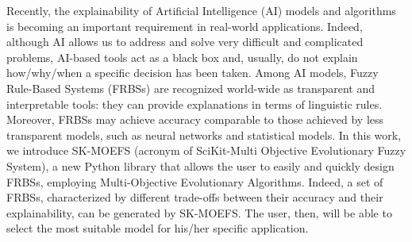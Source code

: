 
Recently, the explainability of Artificial Intelligence (AI) models and algorithms is becoming an important requirement in real-world applications. Indeed, although AI allows us to address and solve very difficult and complicated problems, AI-based tools act as a black box and, usually, do not explain how/why/when a specific decision has been taken. Among AI models, Fuzzy Rule-Based Systems (FRBSs) are recognized world-wide as transparent and interpretable tools: they can provide explanations in terms of linguistic rules. Moreover, FRBSs may achieve accuracy comparable to those achieved by less transparent models, such as neural networks and statistical models. In this work, we introduce SK-MOEFS (acronym of SciKit-Multi Objective Evolutionary Fuzzy System), a new Python library that allows the user to easily and quickly design FRBSs, employing Multi-Objective Evolutionary Algorithms. Indeed, a set of FRBSs, characterized by different trade-offs between their accuracy and their explainability, can be generated by SK-MOEFS. The user, then, will be able to select the most suitable model for his/her specific application.


